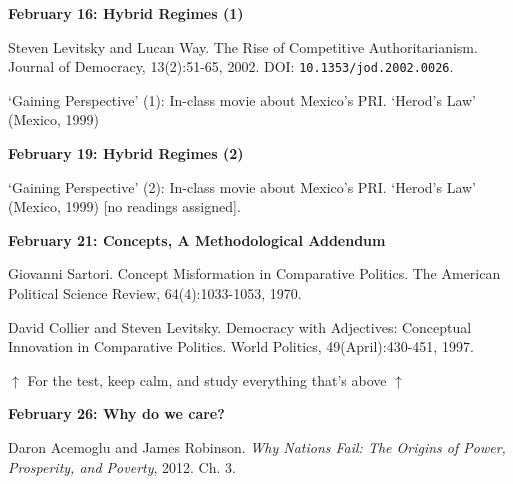 \documentclass[letterpaper]{article}
\renewenvironment{itemize}{
  \begin{list}{}{
    \setlength{\leftmargin}{1.5em}
  }
}{
  \end{list}
}
\begin{document}
\begin{enumerate}
\begin{itemize}
		\item {\bf February 16: Hybrid Regimes (1)}
			\begin{itemize}
				\item[$\bullet$] Steven Levitsky and Lucan Way. The Rise of Competitive Authoritarianism. Journal of Democracy, 13(2):51-65, 2002. DOI: \texttt{10.1353/jod.2002.0026}.
				\item[$\bullet$] `Gaining Perspective' (1): In-class movie about Mexico's PRI. `Herod's Law' (Mexico, 1999)
			\end{itemize}

		\item {\bf February 19: Hybrid Regimes (2)}
			\begin{itemize}
				\item[$\bullet$] `Gaining Perspective' (2): In-class movie about Mexico's PRI. `Herod's Law' (Mexico, 1999) [no readings assigned].
			\end{itemize}



		\item {\bf February 21: Concepts, A Methodological Addendum}
			\begin{itemize}
				\item[$\bullet$] Giovanni Sartori. Concept Misformation in Comparative Politics. The American Political Science Review, 64(4):1033-1053, 1970.
				\item[$\bullet$] David Collier and Steven Levitsky. Democracy with Adjectives: Conceptual Innovation in Comparative Politics. World Politics, 49(April):430-451, 1997.
			\end{itemize}
		
	
	\end{itemize}

\vspace{3mm}

	\begin{center}$\uparrow$ {\color{blue}For the test, keep calm, and study everything that's above} $\uparrow$\end{center}
	\begin{center}\Smiley{}\end{center}


	\begin{itemize} 
		\item[] {\bf February 26: Why do we care?}
			\begin{itemize} 
				\item[$\bullet$] Daron Acemoglu and James Robinson. \emph{Why Nations Fail: The Origins of Power, Prosperity, and Poverty}, 2012. Ch. 3.
			\end{itemize}
	\end{itemize}


\end{enumerate}
\end{document}
